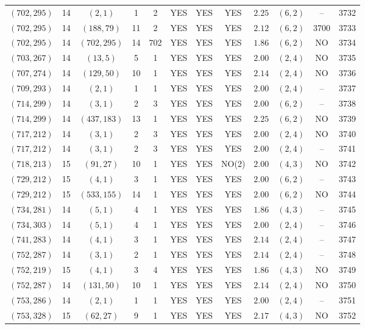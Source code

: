 \begin{longtable}{|c|c|c|c|c|c|c|c|c|c|c|c|}
$(702,295)$ & 14 & $(2,1)$ & 1 & 2 & YES & YES & YES & $2.25$ & $(6,2)$ & -- & 3732\\
$(702,295)$ & 14 & $(188,79)$ & 11 & 2 & YES & YES & YES & $2.12$ & $(6,2)$ & 3700 & 3733\\
$(702,295)$ & 14 & $(702,295)$ & 14 & 702 & YES & YES & YES & $1.86$ & $(6,2)$ & NO & 3734\\
$(703,267)$ & 14 & $(13,5)$ & 5 & 1 & YES & YES & YES & $2.00$ & $(2,4)$ & NO & 3735\\
$(707,274)$ & 14 & $(129,50)$ & 10 & 1 & YES & YES & YES & $2.14$ & $(2,4)$ & NO & 3736\\
$(709,293)$ & 14 & $(2,1)$ & 1 & 1 & YES & YES & YES & $2.00$ & $(2,4)$ & -- & 3737\\
$(714,299)$ & 14 & $(3,1)$ & 2 & 3 & YES & YES & YES & $2.00$ & $(6,2)$ & -- & 3738\\
$(714,299)$ & 14 & $(437,183)$ & 13 & 1 & YES & YES & YES & $2.25$ & $(6,2)$ & NO & 3739\\
$(717,212)$ & 14 & $(3,1)$ & 2 & 3 & YES & YES & YES & $2.00$ & $(2,4)$ & NO & 3740\\
$(717,212)$ & 14 & $(3,1)$ & 2 & 3 & YES & YES & YES & $2.00$ & $(2,4)$ & -- & 3741\\
$(718,213)$ & 15 & $(91,27)$ & 10 & 1 & YES & YES & NO(2) & $2.00$ & $(4,3)$ & NO & 3742\\
$(729,212)$ & 15 & $(4,1)$ & 3 & 1 & YES & YES & YES & $2.00$ & $(6,2)$ & -- & 3743\\
$(729,212)$ & 15 & $(533,155)$ & 14 & 1 & YES & YES & YES & $2.00$ & $(6,2)$ & NO & 3744\\
$(734,281)$ & 14 & $(5,1)$ & 4 & 1 & YES & YES & YES & $1.86$ & $(4,3)$ & -- & 3745\\
$(734,303)$ & 14 & $(5,1)$ & 4 & 1 & YES & YES & YES & $2.00$ & $(2,4)$ & -- & 3746\\
$(741,283)$ & 14 & $(4,1)$ & 3 & 1 & YES & YES & YES & $2.14$ & $(2,4)$ & -- & 3747\\
$(752,287)$ & 14 & $(3,1)$ & 2 & 1 & YES & YES & YES & $2.14$ & $(2,4)$ & -- & 3748\\
$(752,219)$ & 15 & $(4,1)$ & 3 & 4 & YES & YES & YES & $1.86$ & $(4,3)$ & NO & 3749\\
$(752,287)$ & 14 & $(131,50)$ & 10 & 1 & YES & YES & YES & $2.14$ & $(2,4)$ & NO & 3750\\
$(753,286)$ & 14 & $(2,1)$ & 1 & 1 & YES & YES & YES & $2.00$ & $(2,4)$ & -- & 3751\\
$(753,328)$ & 15 & $(62,27)$ & 9 & 1 & YES & YES & YES & $2.17$ & $(4,3)$ & NO & 3752\\

\end{longtable}
